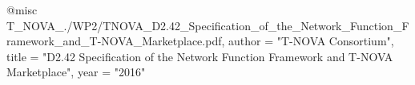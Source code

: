 @misc{ T_NOVA_./WP2/TNOVA_D2.42_Specification_of_the_Network_Function_Framework_and_T-NOVA_Marketplace.pdf,
       author = "T-NOVA Consortium",
       title = "D2.42 Specification of the Network Function Framework and T-NOVA Marketplace",
       year = "2016" }

